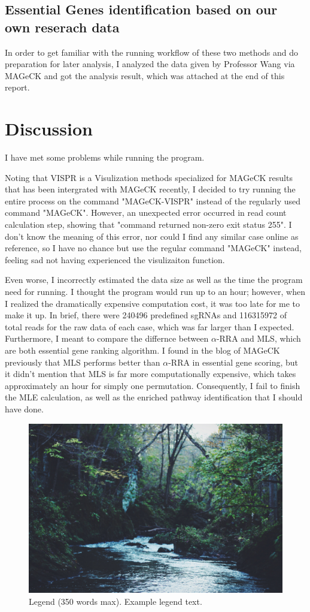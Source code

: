\documentclass[fleqn,10pt]{wlscirep}
\begin{document}
\subsection*{Essential Genes identification based on our own reserach data}
In order to get familiar with the running workflow of these two methods and do preparation for later analysis, I analyzed the data given by Professor Wang via MAGeCK and got the analysis result, which was attached at the end of this report.  


\section*{Discussion}
I have met some problems while running the program.

Noting that VISPR is a Visulization methods specialized for MAGeCK results that has been intergrated with MAGeCK recently, I decided to try running the entire process on the command "MAGeCK-VISPR" instead of the regularly used command "MAGeCK".  However, an unexpected error occurred in read count calculation step, showing that "command returned non-zero exit status 255".  I don't know the meaning of this error, nor could I find any similar case online as reference, so I have no chance but use the regular command "MAGeCK" instead, feeling sad not having experienced the visulizaiton function.

Even worse, I incorrectly estimated the data size as well as the time the program need for running.  I thought the program would run up to an hour;   however, when I realized the dramatically expensive computation cost, it was too late for me to make it up. In brief, there were 240496 predefined sgRNAs and 116315972 of total reads for the raw data of each case, which was far larger than I expected.  Furthermore, I meant to compare the differnce between $\alpha$-RRA and MLS, which are both essential gene ranking algorithm.  I found in the blog of MAGeCK previously that MLS performs better than $\alpha$-RRA in essential gene scoring, but it didn't mention that MLS is far more computationally expensive, which takes approximately an hour for simply one permutation.  Consequently, I fail to finish the MLE calculation, as well as the enriched pathway identification that I should have done. 




\begin{figure}[ht]
\centering
\includegraphics[width=\linewidth]{stream}
\caption{Legend (350 words max). Example legend text.}
\label{fig:stream}
\end{figure}
\end{document}
